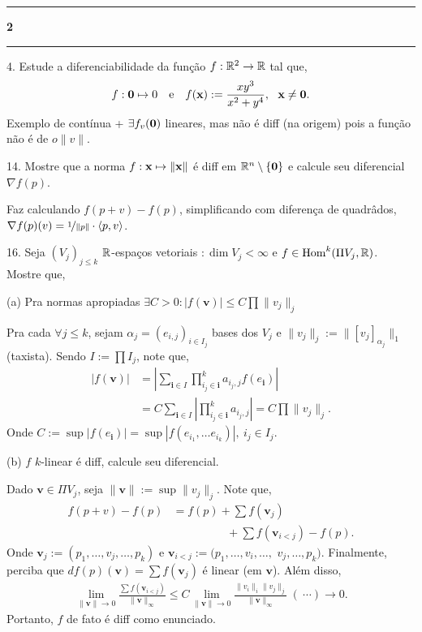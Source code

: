 \-\vspace{-0.3cm}
  {\hrule \vspace{-0.15cm}
  \centering \textbf{2} \vspace{0.1cm}
  \hrule}

4. Estude a diferenciabilidade da função \(f: \mathbb{R}^2 \to \mathbb{R} \) tal que, 
\[f: \textbf{0}\mapsto 0 \text{ \ \ e \ \ } f(\textbf{x}) :=  \frac{xy^3}{x^2 + y^4}, \ \ \textbf{x} \neq \textbf{0}.\] 
\textcolor{gris}{
    Exemplo de contínua + \(\exists f_v(\textbf{0})\) lineares, mas não é diff (na origem) pois a função não é de \(o\|v\|\). 
}

14. Mostre que a norma \(f : \textbf{x} \mapsto \|\textbf{x}\|\) é diff em \(\mathbb{R}^n \setminus \{\textbf{0}\}\) e calcule seu diferencial \(\nabla f (p)\). 

\textcolor{gris}{
    Faz calculando \(f(p+v) - f(p)\), simplificando com diferença de quadrâdos, \(\nabla f(p)(v) = \nicefrac{1}{\|p\|}\cdot \langle p , v\rangle\).
}

16. Seja \((V_j)_{j\leq k} \) \(\mathbb{R}\)-espaços vetoriais \(: \dim V_j < \infty\) e \(f \in \operatorname{Hom}^k(\Pi V_j, \mathbb{R})\). Mostre que, 

(a) Pra normas apropiadas \(\exists C > 0 : |f(\textbf{v})| \leq C \prod \|v_j\|_j\)

\newcommand{\ve}{\textbf{v}}
\textcolor{gris}{
Pra cada \(\forall j\leq k\), sejam \(\alpha_j = (e_{i,j})_{i \in I_j}\) bases dos \(V_j\) e \(\|v_j\|_j := \|[v_j]_{\alpha_j}\|_1\) (taxista). Sendo \(I := \prod I_j\), note que, 
\begin{align*}
    |f(\ve)| &= \left|\sum_{\textbf{i}\in I} \prod_{i_j \in \textbf{i}}^k a_{i_j,j} f(e_{\textbf{i}})\right|\\
     &= C \sum_{\textbf{i}\in I} \left|\prod_{i_j \in \textbf{i}}^k a_{i_j,j}\right| = C \prod \|v_j\|_j.
\end{align*}
Onde \(C:= \sup |f(e_{\textbf{i}})| = \sup |f(e_{i_1}, \ldots e_{i_k})|, \ i_j \in I_j\). 
}

(b) \(f\) \(k\)-linear é diff, calcule seu diferencial.  

\textcolor{gris}{Dado \(\ve \in \Pi V_j\), seja \(\|\ve\|:= \sup \|v_j\|_j\). Note que, 
\begin{align*}
    f(p+v) - f(p) &= f(p) + \sum f(\ve_j) \\ 
    &\hspace{2cm}+ \sum f(\ve_{i<j}) - f(p). 
\end{align*}
Onde \(\ve_j := (p_1, \ldots , v_j, \ldots, p_k)\) e \(\ve_{i<j} := (p_1, \ldots, v_i, \ldots,\) \( v_j, \ldots, p_k)\). Finalmente, perciba que \(df(p)(\ve) = \sum f(\ve_j)\) é linear (em \(\ve\)). Além disso,  
\begin{align*}
    \lim_{\|\ve\|\to 0} \frac{\sum f(\ve_{i<j})}{\|\ve\|_\infty} \leq C \lim_{\|\ve\|\to 0} \frac{\|v_i\|_i \|v_j\|_j}{\|\ve\|_\infty} \ (\ \cdots) \to 0.
\end{align*}
Portanto, \(f \) de fato é diff como enunciado.
}

